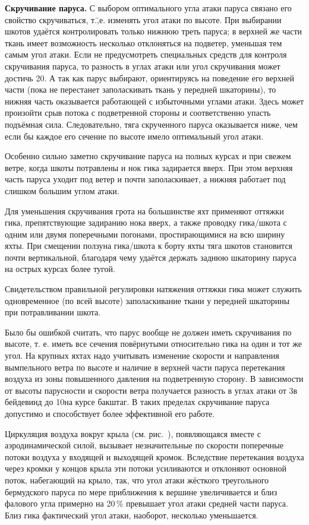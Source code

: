 \textbf{Скручивание паруса.} С выбором оптимального угла атаки паруса связано его свойство скручиваться, т.\=,е. изменять угол атаки по высоте. При выбирании шкотов удаётся контролировать только нижнюю треть паруса; в верхней же части ткань имеет возможность несколько отклоняться на подветер, уменьшая тем самым угол атаки. Если не предусмотреть специальных средств для контроля скручивания паруса, то разность в углах атаки или угол скручивания может достичь 20\gr. А так как парус выбирают, ориентируясь на поведение его верхней части (пока не перестанет заполаскивать ткань у передней шкаторины), то нижняя часть оказывается работающей с избыточными углами атаки. Здесь может произойти срыв потока с подветренной стороны и соответственно упасть подъёмная сила. Следовательно, тяга скрученного паруса оказывается ниже, чем если бы каждое его сечение по высоте имело оптимальный угол атаки. 

Особенно сильно заметно скручивание паруса на полных курсах и при свежем ветре, когда шкоты потравлены и нок гика задирается вверх. При этом верхняя часть паруса уходит под ветер и почти заполаскивает, а нижняя работает под слишком большим углом атаки. 

Для уменьшения скручивания грота на большинстве яхт применяют оттяжки гика, препятствующие задиранию нока вверх, а также проводку гика\-/шкота с одним или двумя поперечными погонами, простирающимися на всю ширину яхты. При смещении ползуна гика\-/шкота к борту яхты тяга шкотов становится почти вертикальной, благодаря чему удаётся держать заднюю шкаторину паруса на острых курсах более тугой. 

Свидетельством правильной регулировки натяжения оттяжки гика может служить одновременное (по всей высоте) заполаскивание ткани у передней шкаторины при потравливании шкота.

Было бы ошибкой считать, что парус вообще не должен иметь скручивания по высоте, т. е. иметь все сечения повёрнутыми относительно гика на один и тот же угол. На крупных яхтах надо учитывать изменение скорости и направления вымпельного ветра по высоте и наличие в верхней части паруса перетекания воздуха из зоны повышенного давления на подветренную сторону. В зависимости от высоты парусности и скорости ветра получается разность в углах атаки от 3\gr в бейдевинд до 10\gr на курсе бакштаг. В таких пределах скручивание паруса допустимо и способствует более эффективной его работе. 

Циркуляция воздуха вокруг крыла (см. рис.~), появляющаяся вместе с аэродинамической силой, вызывает незначительные по скорости поперечные потоки воздуха  у входящей и выходящей кромок. Вследствие перетекания воздуха через кромки у концов крыла эти потоки усиливаются и отклоняют основной поток, набегающий на крыло, так, что угол атаки жёсткого треугольного бермудского паруса по мере приближения к вершине увеличивается и близ фалового угла примерно на 20\,\% превышает угол атаки средней части паруса. Близ гика фактический угол атаки, наоборот, несколько уменьшается.

